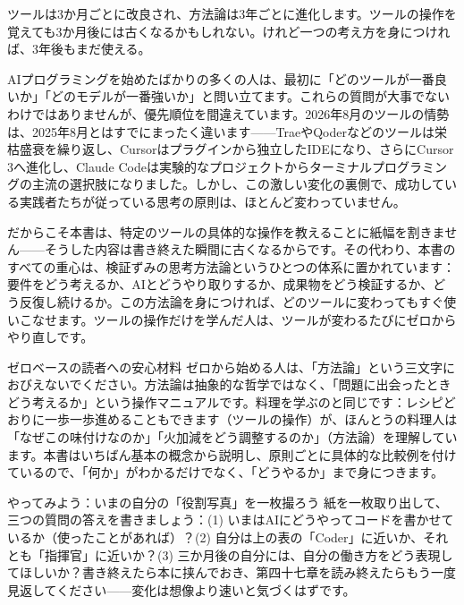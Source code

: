 
ツールは3か月ごとに改良され、方法論は3年ごとに進化します。ツールの操作を覚えても3か月後には古くなるかもしれない。けれど一つの考え方を身につければ、3年後もまだ使える。

AIプログラミングを始めたばかりの多くの人は、最初に「どのツールが一番良いか」「どのモデルが一番強いか」と問い立てます。これらの質問が大事でないわけではありませんが、優先順位を間違えています。2026年8月のツールの情勢は、2025年8月とはすでにまったく違います——TraeやQoderなどのツールは栄枯盛衰を繰り返し、Cursorはプラグインから独立したIDEになり、さらにCursor 3へ進化し、Claude Codeは実験的なプロジェクトからターミナルプログラミングの主流の選択肢になりました。しかし、この激しい変化の裏側で、成功している実践者たちが従っている思考の原則は、ほとんど変わっていません。

だからこそ本書は、特定のツールの具体的な操作を教えることに紙幅を割きません——そうした内容は書き終えた瞬間に古くなるからです。その代わり、本書のすべての重心は、検証ずみの思考方法論というひとつの体系に置かれています：要件をどう考えるか、AIとどうやり取りするか、成果物をどう検証するか、どう反復し続けるか。この方法論を身につければ、どのツールに変わってもすぐ使いこなせます。ツールの操作だけを学んだ人は、ツールが変わるたびにゼロからやり直しです。

\begin{tcbinfo}{ゼロベースの読者への安心材料}
ゼロから始める人は、「方法論」という三文字におびえないでください。方法論は抽象的な哲学ではなく、「問題に出会ったときどう考えるか」という操作マニュアルです。料理を学ぶのと同じです：レシピどおりに一歩一歩進めることもできます（ツールの操作）が、ほんとうの料理人は「なぜこの味付けなのか」「火加減をどう調整するのか」（方法論）を理解しています。本書はいちばん基本の概念から説明し、原則ごとに具体的な比較例を付けているので、「何か」がわかるだけでなく、「どうやるか」まで身につきます。

\end{tcbinfo}

\begin{tcbpractice}{やってみよう：いまの自分の「役割写真」を一枚撮ろう}
紙を一枚取り出して、三つの質問の答えを書きましょう：(1) いまはAIにどうやってコードを書かせているか（使ったことがあれば）？(2) 自分は上の表の「Coder」に近いか、それとも「指揮官」に近いか？(3) 三か月後の自分には、自分の働き方をどう表現してほしいか？書き終えたら本に挟んでおき、第四十七章を読み終えたらもう一度見返してください——変化は想像より速いと気づくはずです。

\end{tcbpractice}

